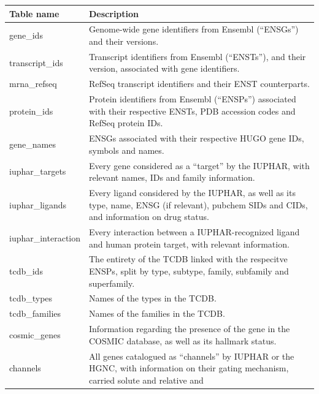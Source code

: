 \begin{table}
\begin{tabularx}{\textwidth}{|l|X|}
        \hline
    \textbf{Table name}
        & \textbf{Description} \\
        \hline
        \hline
    gene\_ids
        & Genome-wide gene identifiers from Ensembl (``ENSGs'') and their
        versions. \\
        \hline
    transcript\_ids
        & Transcript identifiers from Ensembl (``ENSTs''), and their version,
        associated with gene identifiers. \\
        \hline
    mrna\_refseq
        & RefSeq transcript identifiers and their ENST counterparts. \\
        \hline
    protein\_ids
        & Protein identifiers from Ensembl (``ENSPs'') associated with their
        respective ENSTs, PDB accession codes and RefSeq protein IDs. \\
        \hline
    gene\_names
        & ENSGs associated with their respective HUGO gene IDs, symbols and
        names. \\
        \hline
    iuphar\_targets
        & Every gene considered as a ``target'' by the IUPHAR, with relevant
        names, IDs and family information. \\
        \hline
    iuphar\_ligands
        & Every ligand considered by the IUPHAR, as well as its type, name, ENSG
        (if relevant), pubchem SIDs and CIDs, and information on drug status. \\
        \hline
    iuphar\_interaction
        & Every interaction between a IUPHAR-recognized ligand and human protein
        target, with relevant information. \\
        \hline
    tcdb\_ids
        & The entirety of the TCDB linked with the respecitve ENSPs, split by
        type, subtype, family, subfamily and superfamily. \\
        \hline
    tcdb\_types
        & Names of the types in the TCDB. \\
        \hline
    tcdb\_families
        & Names of the families in the TCDB. \\
        \hline
    cosmic\_genes
        & Information regarding the presence of the gene in the COSMIC database,
        as well as its hallmark status. \\
        \hline
    channels
        & All genes catalogued as ``channels'' by IUPHAR or the HGNC, with
        information on their gating mechanism, carried solute and relative and

\end{tabularx}
\end{table}
